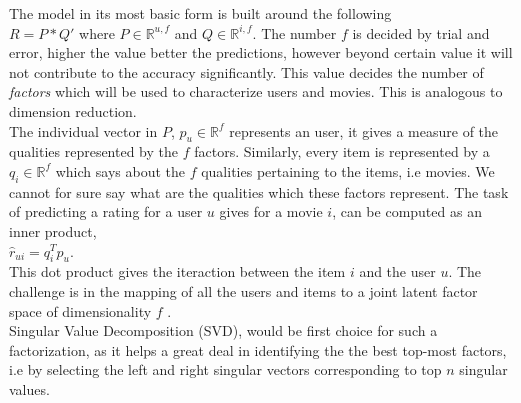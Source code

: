  The model in its most basic form is built around the following \\
 $R=P*Q'$
 where $P\in\mathbb{R}^{u,f}$ and $Q\in\mathbb{R}^{i,f}$. The number $f$ is
decided by trial and error, higher the value better the predictions, however
beyond certain value it will not contribute to the accuracy significantly. This
value decides the number of \emph{factors} which will be used to characterize
users and movies. This is analogous to dimension reduction. \\
The individual vector in $P$, $p_{u}\in\mathbb{R}^f$ represents an user, it
gives a measure of the qualities represented by the $f$ factors. Similarly,
every item is represented by a $q_{i}\in\mathbb{R}^f$ which says about the $f$
qualities pertaining to the items, i.e movies. We cannot for sure say what are
the qualities which these factors represent. The task of predicting a rating
for a user $u$ gives for a movie $i$, can be computed as an inner product, \\

$\hat{r}_{ui}=q_{i}^Tp_{u}.$ \\

This dot product gives the iteraction between the item $i$ and the user $u$. The
challenge is in the mapping of all the users and items to a joint latent factor
space of dimensionality $f$ \cite{Koren:2009:MFT:1608565.1608614}.\\
Singular Value Decomposition (SVD), would be first choice for such a
factorization, as it helps a great deal in identifying the the best top-most
factors, i.e by selecting the left and right singular vectors corresponding to
top $n$ singular values. \\

